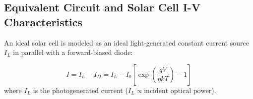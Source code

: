 \documentclass[12pt,a4paper]{article}
\begin{document}
\subsection{Equivalent Circuit and Solar Cell I-V Characteristics}
An ideal solar cell is modeled as an ideal light-generated constant current source $I_L$ in parallel with a forward-biased diode:

\begin{tcolorbox}[formulabox, title={\textbf{Solar Cell Current-Voltage Equation}}]
\begin{equation}
  I = I_L - I_D = I_L - I_0 \left[ \exp\left(\frac{q V}{\eta k T}\right) - 1 \right]
\end{equation}
where $I_L$ is the photogenerated current ($I_L \propto \text{incident optical power}$).
\end{tcolorbox}
\end{document}
